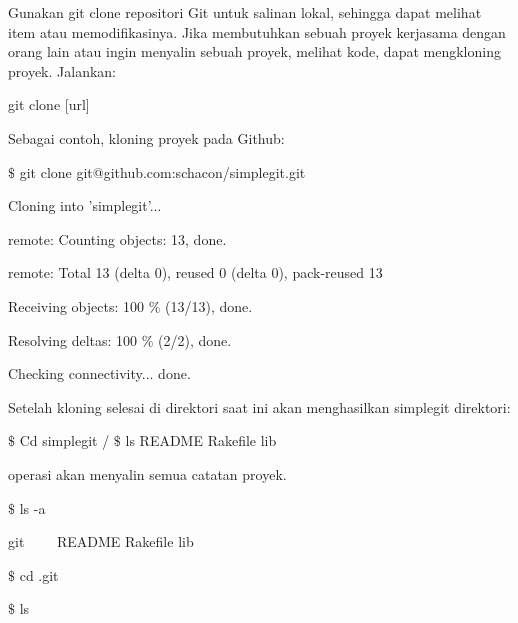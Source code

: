 \vspace{12pt}
\hspace*{0.5in} Gunakan git clone repositori Git untuk salinan lokal, sehingga dapat melihat item atau memodifikasinya. Jika membutuhkan sebuah proyek kerjasama dengan orang lain atau ingin menyalin sebuah proyek, melihat kode, dapat mengkloning proyek. Jalankan:  \par
\noindent 
{\fontsize{10pt}{10pt}\selectfont git clone [url]} \par
\vspace{12pt}
\noindent 
Sebagai contoh, kloning proyek pada Github: \par
\noindent 
{\fontsize{10pt}{10pt}\selectfont  $  \$  $ git clone git@github.com:schacon/simplegit.git} \par
\noindent 
{\fontsize{10pt}{10pt}\selectfont Cloning into 'simplegit'...} \par
\noindent 
{\fontsize{10pt}{10pt}\selectfont remote: Counting objects: 13, done.} \par
\noindent 
{\fontsize{10pt}{10pt}\selectfont remote: Total 13 (delta 0), reused 0 (delta 0), pack-reused 13} \par
\noindent 
{\fontsize{10pt}{10pt}\selectfont Receiving objects: 100 $  \%  $ (13/13), done.} \par
\noindent 
{\fontsize{10pt}{10pt}\selectfont Resolving deltas: 100 $  \%  $ (2/2), done.} \par
\noindent 
{\fontsize{10pt}{10pt}\selectfont Checking connectivity... done.} \par
\vspace{12pt}
\noindent 
\hspace*{0.5in} Setelah kloning selesai di direktori saat ini akan menghasilkan simplegit direktori:  \par
\noindent 
{\fontsize{10pt}{10pt}\selectfont  $  \$  $ Cd simplegit /  $  \$  $ ls README Rakefile lib } \par
\noindent 
operasi akan menyalin semua catatan proyek.  \par
\vspace{12pt}
\noindent 
{\fontsize{10pt}{10pt}\selectfont  $  \$  $ ls -a} \par
\noindent 
{\fontsize{10pt}{10pt}\selectfont git~~~~ README   Rakefile lib} \par
\noindent 
{\fontsize{10pt}{10pt}\selectfont  $  \$  $ cd .git} \par
\noindent 
{\fontsize{10pt}{10pt}\selectfont  $  \$  $ ls} \par
